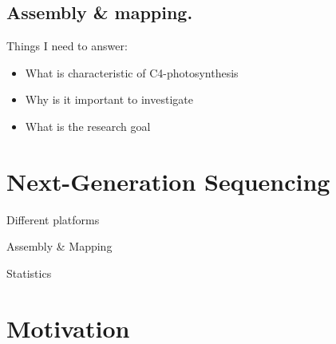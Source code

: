 \subsection{Assembly \& mapping.}

Things I need to answer:
\begin{itemize}
	\item What is characteristic of C4-photosynthesis
	\item Why is it important to investigate
	\item What is the research goal
\end{itemize}
\section{Next-Generation Sequencing}
	\item Different platforms
	\item Assembly \& Mapping
	\item Statistics
\section{Motivation}
